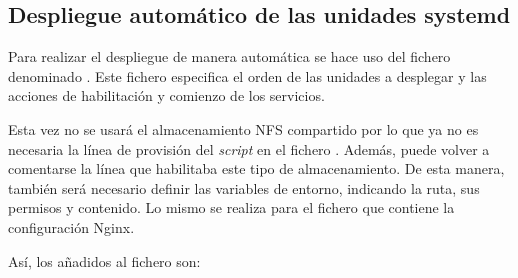 \subsection{Despliegue automático de las unidades systemd}

Para realizar el despliegue de manera automática se hace uso del fichero  denominado . Este fichero especifica el orden de las unidades a desplegar y las acciones de habilitación y comienzo de los servicios.

Esta vez no se usará el almacenamiento NFS compartido por lo que ya no es necesaria la línea de provisión del \textit{script} en el fichero . Además, puede volver a comentarse la línea que habilitaba este tipo de almacenamiento. De esta manera, también será necesario definir las variables de entorno, indicando la ruta, sus permisos y contenido. Lo mismo se realiza para el fichero que contiene la configuración Nginx.

Así, los añadidos al fichero  son:

